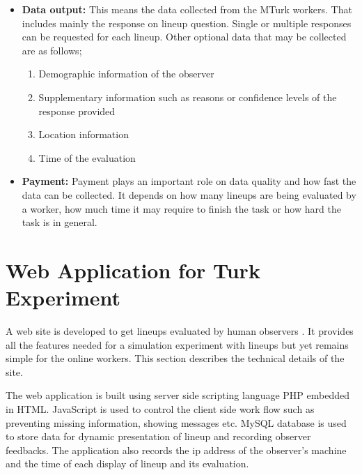 \documentclass[11pt]{article}
\begin{document}
\begin{itemize}
\item {\bf Data output:} This means the data collected from the MTurk workers. That includes mainly the response on lineup question. Single or multiple responses can be requested for each lineup. Other optional data that may be collected are as follows;

\begin{enumerate}
\item Demographic information of the observer
\item Supplementary information such as reasons or confidence levels of the response provided
\item Location information
\item Time of the evaluation
\end{enumerate}

\item {\bf Payment:} Payment plays an important role on data quality and how fast the data can be collected. It depends on how many lineups are being evaluated by a worker, how much time it may require to finish the task or how hard the task is in general.

%
%
%
%
%
%

\end{itemize}


\section{Web Application for Turk Experiment} \label{sec:web_application}

A web site is developed to get lineups evaluated by human observers \citep{majumder:turk}. It provides all the features needed for a simulation experiment with lineups but yet remains simple for the online workers. This section describes the technical details of the site. 

The web application is built using server side scripting language PHP embedded in HTML. JavaScript is used to control the client side work flow such as preventing missing information, showing messages etc. MySQL database is used to store data for dynamic presentation of lineup and recording observer feedbacks. The application also records the ip address of the observer's machine and the time of each display of lineup and its evaluation.  
\end{document}
